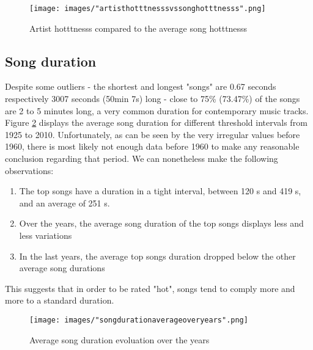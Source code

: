 \documentclass[11pt]{article}
\renewcommand\_{\textunderscore\allowbreak}
\begin{document}
\begin{figure}[h!]
\centering
\captionsetup{width=1.0\textwidth}
\texttt{[image: images/"artist\_hotttnesss\_vs\_song\_hotttnesss".png]}
\caption{Artist hotttnesss compared to the average song hotttnesss}
\label{fig:artist_hotttnesss}
\end{figure}

\subsection{Song duration}
Despite some outliers - the shortest and longest "songs" are 0.67 seconds respectively 3007 seconds (50min 7s) long - close to 75\% (73.47\%) of the songs are 2 to 5 minutes long, a very common duration for contemporary music tracks.
Figure \ref{fig:song_duration_over_years} displays the average song duration for different threshold intervals from 1925 to 2010. 
Unfortunately, as can be seen by the very irregular values before 1960, there is most likely not enough data before 1960 to make any reasonable conclusion regarding that period. 
We can nonetheless make the following observations:
\begin{enumerate}
\itemsep 0mm
\item The top songs have a duration in a tight interval, between 120 s and 419 s, and an average of 251 s.
\item Over the years, the average song duration of the top songs displays less and less variations
\item In the last years, the average top songs duration dropped below the other average song durations
\end{enumerate}
This suggests that in order to be rated "hot", songs tend to comply more and more to a standard duration.

\begin{figure}[h!]
\centering
\captionsetup{width=1.0\textwidth}
\texttt{[image: images/"song\_duration\_average\_over\_years".png]}
\caption{Average song duration evoluation over the years}
\label{fig:song_duration_over_years}
\end{figure}
\end{document}
